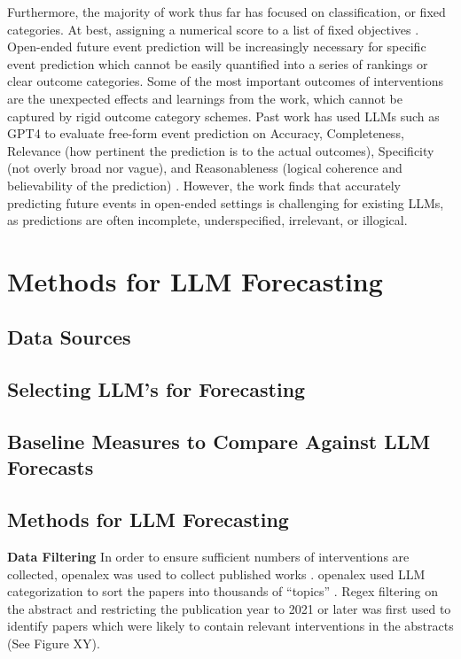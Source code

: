 \documentclass[12pt,a4paper]{article}
\begin{document}
Furthermore, the majority of work thus far has focused on classification, or fixed categories. At best, assigning a numerical score to a list of fixed objectives  . Open-ended future event prediction will be increasingly necessary for specific event prediction which cannot be easily quantified into a series of rankings or clear outcome categories. Some of the most important outcomes of interventions are the unexpected effects and learnings from the work, which cannot be captured by rigid outcome category schemes. Past work has used LLMs such as GPT4 to evaluate free-form event prediction on Accuracy, Completeness, Relevance (how pertinent the prediction is to the actual outcomes), Specificity (not overly broad nor vague), and Reasonableness (logical coherence and believability of the prediction) . However, the work finds that accurately predicting future events in open-ended settings is challenging for existing LLMs, as predictions are often incomplete, underspecified, irrelevant, or illogical.

\section{Methods for LLM Forecasting}
\subsection{Data Sources}

\subsection{Selecting LLM's for Forecasting \DOMAINCAPITALIZEDINTERVENTIONTWO }
\subsection{Baseline Measures to Compare Against LLM Forecasts}
\subsection{Methods for LLM Forecasting}
\textbf{Data Filtering}
In order to ensure sufficient numbers of interventions are collected, openalex was used to collect published works . openalex used LLM categorization to sort the papers into thousands of ``topics'' . Regex filtering on the abstract and restricting the publication year to 2021 or later was first used to identify papers which were likely to contain relevant interventions in the abstracts (See Figure XY).
\end{document}
